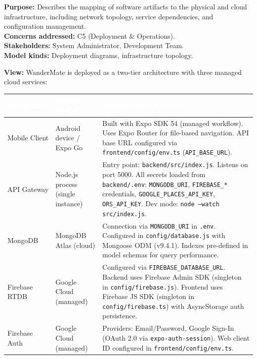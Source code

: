 \documentclass[12pt, a4paper]{article}
\newcommand{\thcell}[1]{\textcolor{white}{\textbf{\small #1}}}
\newcommand{\code}[1]{\texttt{\small #1}}
\begin{document}
\begin{tcolorbox}[notebox]
\textbf{Purpose:} Describes the mapping of software artifacts to the physical and cloud infrastructure, including network topology, service dependencies, and configuration management.\\[3pt]
\textbf{Concerns addressed:} C5 (Deployment \& Operations).\\[3pt]
\textbf{Stakeholders:} System Administrator, Development Team.\\[3pt]
\textbf{Model kinds:} Deployment diagrams, infrastructure topology.
\end{tcolorbox}

\textbf{View:} WanderMate is deployed as a two-tier architecture with three managed cloud services:

\begin{longtable}{L{3.0cm} L{3.5cm} L{6.5cm}}
\toprule
{}
\thcell{Component} & \thcell{Runtime Target} & \thcell{Configuration \& Notes} \\
\midrule
\endhead
\bottomrule
\endfoot

Mobile Client & Android device / Expo Go & Built with Expo SDK 54 (managed workflow). Uses Expo Router for file-based navigation. API base URL configured via \code{frontend/config/env.ts} (\code{API\_BASE\_URL}). \\

API Gateway & Node.js process (single instance) & Entry point: \code{backend/src/index.js}. Listens on port 5000. All secrets loaded from \code{backend/.env}: \code{MONGODB\_URI}, \code{FIREBASE\_*} credentials, \code{GOOGLE\_PLACES\_API\_KEY}, \code{ORS\_API\_KEY}. Dev mode: \code{node --watch src/index.js}. \\

MongoDB & MongoDB Atlas (cloud) & Connection via \code{MONGODB\_URI} in \code{.env}. Configured in \code{config/database.js} with Mongoose ODM (v9.4.1). Indexes pre-defined in model schemas for query performance. \\

Firebase RTDB & Google Cloud (managed) & Configured via \code{FIREBASE\_DATABASE\_URL}. Backend uses Firebase Admin SDK (singleton in \code{config/firebase.js}). Frontend uses Firebase JS SDK (singleton in \code{config/firebase.ts}) with AsyncStorage auth persistence. \\

Firebase Auth & Google Cloud (managed) & Providers: Email/Password, Google Sign-In (OAuth 2.0 via \code{expo-auth-session}). Web client ID configured in \code{frontend/config/env.ts}. \\

\end{longtable}
\end{document}
